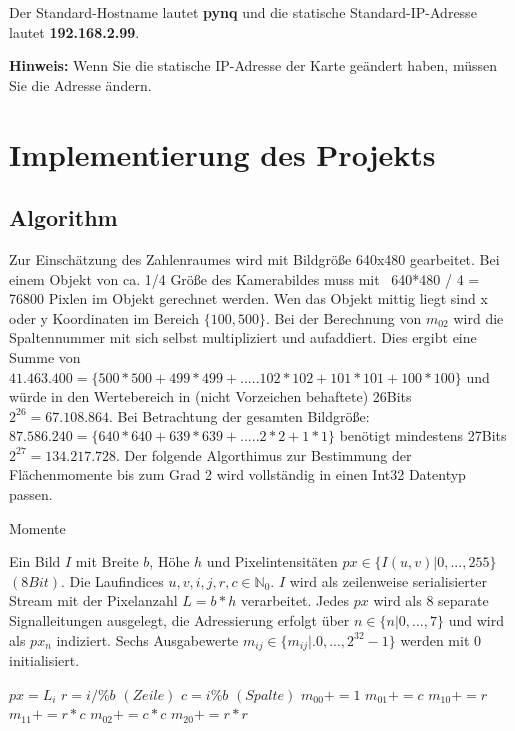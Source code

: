 \documentclass[a4paper]{report}
\begin{document}
Der Standard-Hostname lautet \textbf{pynq} und die statische Standard-IP-Adresse lautet \textbf{192.168.2.99}.

\textbf{Hinweis: } Wenn Sie die statische IP-Adresse der Karte geändert haben, müssen Sie die Adresse ändern. 




\chapter{Implementierung des Projekts}
\label{Implementierung_des_Projekts}

\section{Algorithm}
 
Zur Einschätzung des Zahlenraumes wird mit Bildgröße 640x480 gearbeitet. Bei einem Objekt von ca. 1/4 Größe des Kamerabildes muss mit ~640*480 / 4 = 76800 Pixlen im Objekt gerechnet werden. Wen das Objekt mittig liegt sind x oder y Koordinaten im Bereich $\{100,500\}$. Bei der Berechnung von $m_{02}$ wird die Spaltennummer mit sich selbst multipliziert und aufaddiert. Dies ergibt eine Summe von $41.463.400=\{500*500+499*499+.....102*102+101*101+100*100\}$ und würde in den Wertebereich in (nicht Vorzeichen behaftete) 26Bits $2^{26}=67.108.864$. Bei  Betrachtung der gesamten Bildgröße: $87.586.240=\{640*640+639*639+.....2*2+1*1\}$ benötigt mindestens 27Bits $2^{27}=134.217.728$.
Der folgende Algorthimus zur Bestimmung der Flächenmomente bis zum Grad 2 wird vollständig in einen Int32 Datentyp passen.

 
\begin{algorithm}
\caption{Momente}
\label{Momente}
\begin{algorithmic}[1]
\Require Ein Bild $I$ mit Breite {$b$}, Höhe {$h$} und Pixelintensitäten $px\in \{I(u,v)|0,...,255\}$ $(8Bit)$. Die Laufindices $u,v,i,j,r,c \in \mathbb{N}_0$. $I$ wird als zeilenweise serialisierter Stream mit der Pixelanzahl {$L=b*h$} verarbeitet. Jedes $px$ wird als 8 separate Signalleitungen ausgelegt, die Adressierung erfolgt über $n\in \{n|0,...,7\}$ und wird als $px_n$ indiziert. Sechs Ausgabewerte {$m_{ij}\in \{m_{ij}|.0,...,2^{32}-1\}$} werden mit 0 initialisiert.

	\State $px = L_i$
    	\State $r=i/\%b$ $(Zeile)$
    	\State $c=i\%b$  $(Spalte)$
      	\State $m_{00}+=1$    
	    \State $m_{01}+= c$ 
    	\State $m_{10}+= r$
    	\State $m_{11}+= r*c$
    	\State $m_{02}+= c*c$
    	\State $m_{20}+= r*r$
    \EndIf
\EndFor
\end{algorithmic}
\end{algorithm}
\end{document}
